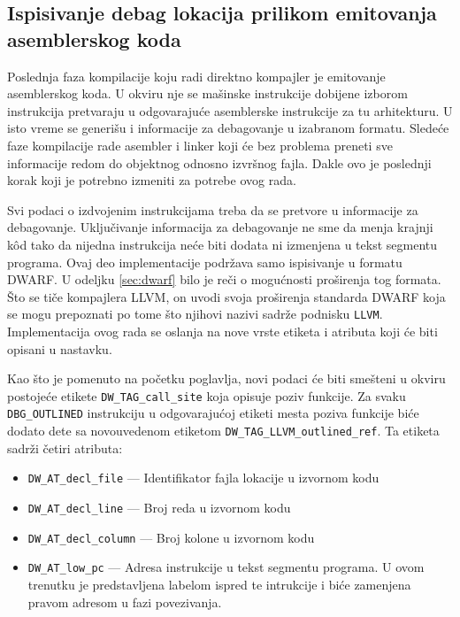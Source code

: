 \documentclass[12pt,oneside]{memoir}
\begin{document}
\subsection{Ispisivanje debag lokacija prilikom emitovanja asemblerskog koda}


Poslednja faza kompilacije koju radi direktno kompajler je emitovanje asemblerskog koda.
U okviru nje se mašinske instrukcije dobijene izborom instrukcija pretvaraju u odgovarajuće asemblerske instrukcije za tu arhitekturu.
U isto vreme se generišu i informacije za debagovanje u izabranom formatu.
Sledeće faze kompilacije rade asembler i linker koji će bez problema preneti sve informacije redom do objektnog odnosno izvršnog fajla.
Dakle ovo je poslednji korak koji je potrebno izmeniti za potrebe ovog rada.


Svi podaci o izdvojenim instrukcijama treba da se pretvore u informacije za debagovanje.
Uključivanje informacija za debagovanje ne sme da menja krajnji k\^od tako da nijedna instrukcija neće biti dodata ni izmenjena u tekst segmentu programa.
Ovaj deo implementacije podržava samo ispisivanje u formatu DWARF.
U odeljku \ref{sec:dwarf} bilo je reči o mogućnosti proširenja tog formata.
Što se tiče kompajlera LLVM, on uvodi svoja proširenja standarda DWARF koja se mogu prepoznati po tome što njihovi nazivi sadrže podnisku \verb|LLVM|.
Implementacija ovog rada se oslanja na nove vrste etiketa i atributa koji će biti opisani u nastavku. 

Kao što je pomenuto na početku poglavlja, novi podaci će biti smešteni u okviru postojeće etikete \verb|DW_TAG_call_site| koja opisuje poziv funkcije.
Za svaku \verb|DBG_OUTLINED| instrukciju u odgovarajućoj etiketi mesta poziva funkcije biće dodato dete sa novouvedenom etiketom \verb|DW_TAG_LLVM_outlined_ref|.
Ta etiketa sadrži četiri atributa:
\begin{itemize}
  \item \verb|DW_AT_decl_file| --- Identifikator fajla lokacije u izvornom kodu
  \item \verb|DW_AT_decl_line| --- Broj reda u izvornom kodu
  \item \verb|DW_AT_decl_column| --- Broj kolone u izvornom kodu
  \item \verb|DW_AT_low_pc| --- Adresa instrukcije u tekst segmentu programa. U ovom trenutku je predstavljena labelom ispred te intrukcije i biće zamenjena pravom adresom u fazi povezivanja.
\end{itemize}
\end{document}
